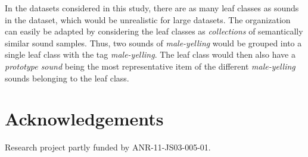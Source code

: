 \documentclass{aes2e}
\begin{document}
In the datasets considered in this study, there are as many leaf classes as sounds in the dataset, which would be unrealistic for large datasets. The organization can easily be adapted by considering the leaf classes as \textit{collections} of semantically similar sound samples. Thus, two sounds of \textit{male-yelling} would be grouped into a single leaf class with the tag \textit{male-yelling}. The leaf class would then also have a \textit{prototype sound} being the most representative item of the different \textit{male-yelling} sounds belonging to the leaf class.

%


\section{Acknowledgements}

Research project partly funded by ANR-11-JS03-005-01.



%
%
\end{document}
